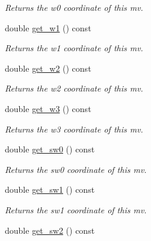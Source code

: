 \begin{DoxyCompactItemize}
\begin{DoxyCompactList}\small\item\em Returns the w0 coordinate of this mv. \end{DoxyCompactList}\item 
\hypertarget{classe3ga_1_1mv_a1a50edbbcdc0b5955399a570338fcb92}{double \hyperlink{classe3ga_1_1mv_a1a50edbbcdc0b5955399a570338fcb92}{get\-\_\-w1} () const }\label{classe3ga_1_1mv_a1a50edbbcdc0b5955399a570338fcb92}

\begin{DoxyCompactList}\small\item\em Returns the w1 coordinate of this mv. \end{DoxyCompactList}\item 
\hypertarget{classe3ga_1_1mv_a7ad7132e73d9872b48d563e007596a4d}{double \hyperlink{classe3ga_1_1mv_a7ad7132e73d9872b48d563e007596a4d}{get\-\_\-w2} () const }\label{classe3ga_1_1mv_a7ad7132e73d9872b48d563e007596a4d}

\begin{DoxyCompactList}\small\item\em Returns the w2 coordinate of this mv. \end{DoxyCompactList}\item 
\hypertarget{classe3ga_1_1mv_a9e16e8d33484251f457430a8b58dcaa5}{double \hyperlink{classe3ga_1_1mv_a9e16e8d33484251f457430a8b58dcaa5}{get\-\_\-w3} () const }\label{classe3ga_1_1mv_a9e16e8d33484251f457430a8b58dcaa5}

\begin{DoxyCompactList}\small\item\em Returns the w3 coordinate of this mv. \end{DoxyCompactList}\item 
\hypertarget{classe3ga_1_1mv_a79792002088f32774f1442f955764166}{double \hyperlink{classe3ga_1_1mv_a79792002088f32774f1442f955764166}{get\-\_\-sw0} () const }\label{classe3ga_1_1mv_a79792002088f32774f1442f955764166}

\begin{DoxyCompactList}\small\item\em Returns the sw0 coordinate of this mv. \end{DoxyCompactList}\item 
\hypertarget{classe3ga_1_1mv_a853d169c8f738a8f4e604c2f49b3d700}{double \hyperlink{classe3ga_1_1mv_a853d169c8f738a8f4e604c2f49b3d700}{get\-\_\-sw1} () const }\label{classe3ga_1_1mv_a853d169c8f738a8f4e604c2f49b3d700}

\begin{DoxyCompactList}\small\item\em Returns the sw1 coordinate of this mv. \end{DoxyCompactList}\item 
\hypertarget{classe3ga_1_1mv_aa4007e1740a7551db8df275ba1df4540}{double \hyperlink{classe3ga_1_1mv_aa4007e1740a7551db8df275ba1df4540}{get\-\_\-sw2} () const }\label{classe3ga_1_1mv_aa4007e1740a7551db8df275ba1df4540}


\end{DoxyCompactItemize}

